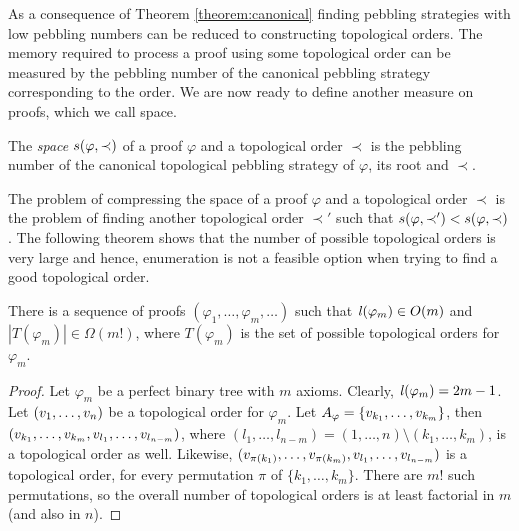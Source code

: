 As a consequence of Theorem \ref{theorem:canonical} finding pebbling strategies with low pebbling numbers can be reduced to constructing topological orders.
The memory required to process a proof using some topological order can be measured by the pebbling number of the canonical pebbling strategy corresponding to the order.
We are now ready to define another measure on proofs, which we call space.

\begin{definition}
\label{def:space measure}
The \emph{space} $s(\varphi,\prec)$ 
of a proof $\varphi$ and a topological order $\prec$ is the pebbling number of the canonical topological pebbling strategy of $\varphi$, its root and $\prec$.
\end{definition}

The problem of compressing the space of a proof $\varphi$ and a topological order $\prec$ is the problem of finding another topological order $\prec'$ such that $s(\varphi,\prec') < s(\varphi,\prec)$. The following theorem shows that the number of possible topological orders is very large and hence, enumeration is not a feasible option when trying to find a good topological order.

\begin{theorem}
\label{theorem:enumeration}
There is a sequence of proofs $(\varphi_1,\ldots,\varphi_m,\ldots)$ such that $\mathit{l}(\varphi_m) \in O(m)$ and $|T(\varphi_m)| \in \Omega(m!)$, where $T(\varphi_m)$ is the set of possible topological orders for $\varphi_m$.
\end{theorem}
\begin{proof}
Let $\varphi_m$ be a perfect binary tree with $m$ axioms. Clearly, $\mathit{l}(\varphi_m) = 2m-1$.
Let $(v_1,\ldots,v_n)$ be a topological order for $\varphi_m$. 
Let $A_{\varphi} = \{v_{k_1},\ldots,v_{k_m}\}$, then\\ $(v_{k_1},\ldots,v_{k_m},v_{l_1},\ldots,v_{l_{n-m}})$, where $(l_1,\ldots,l_{n-m}) = (1,\ldots,n) \setminus (k_1,\ldots,k_m)$, is a topological order as well. 
Likewise, $(v_{\pi({k_1})},\ldots,v_{\pi({k_m})},v_{l_1},\ldots,v_{l_{n-m}})$ is a topological order, for every permutation $\pi$ of $\{k_1,\ldots,k_m\}$. There are $m!$ such permutations, so the overall number of topological orders is at least factorial in $m$ (and also in $n$).
\end{proof}

